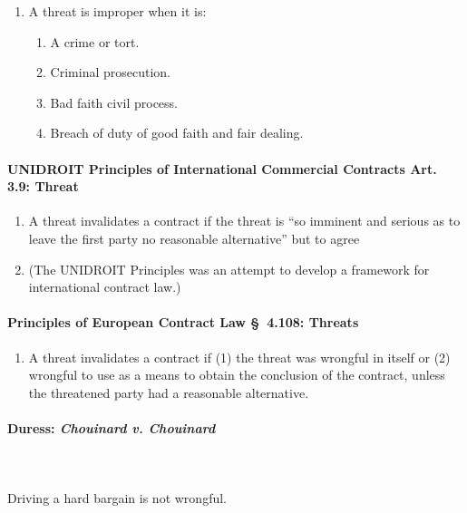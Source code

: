 \begin{enumerate}
    \item A threat is improper when it is:
    \begin{enumerate}
        \item A crime or tort.
        \item Criminal prosecution.
        \item Bad faith civil process.
        \item Breach of duty of good faith and fair dealing.
    \end{enumerate}
\end{enumerate}

\paragraph{UNIDROIT Principles of International Commercial Contracts Art.  
3.9: Threat}

\begin{enumerate}
    \item A threat invalidates a contract if the threat is ``so imminent and 
    serious as to leave the first party no reasonable alternative'' but to 
    agree
    \item (The UNIDROIT Principles was an attempt to develop a framework for 
    international contract law.)
\end{enumerate}

\paragraph{Principles of European Contract Law \S\ 4.108: Threats}

\begin{enumerate}
    \item A threat invalidates a contract if (1) the threat was wrongful in 
    itself or (2) wrongful to use as a means to obtain the conclusion of the 
    contract, unless the threatened party had a reasonable alternative.
\end{enumerate}

\paragraph{Duress: \emph{Chouinard v. Chouinard}}
~\\\\
Driving a hard bargain is not wrongful.


